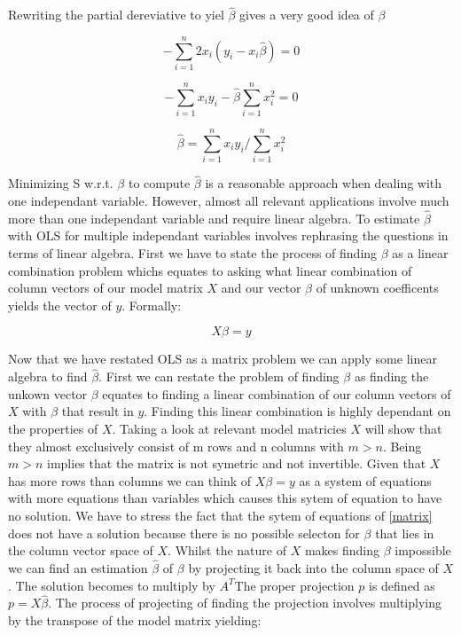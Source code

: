 \documentclass{article}
\begin{document}
    Rewriting the partial dereviative to yiel $\widehat{\beta}$ gives a very good idea of $\beta$

    \begin{equation}  - \sum_{i=1}^{n} 2x_i(y_i-x_i\widehat{\beta}) = 0  \end{equation}

    \begin{equation} - \sum_{i=1}^{n} x_iy_i-\widehat{\beta} \sum_{i=1}^{n} x_i^2 = 0  \end{equation}

    \begin{equation} \widehat{\beta} = \sum_{i=1}^{n} x_iy_i /\sum_{i=1}^{n} x_i^2 \end{equation}


    Minimizing S w.r.t. $\beta$ to compute $\widehat{\beta}$ is a reasonable approach when dealing with one independant variable. However, almost all relevant applications involve much more than one independant variable and require linear algebra. To estimate $\widehat{\beta}$ with OLS for multiple independant variables involves rephrasing the questions in terms of linear algebra. First we have to state the process of finding $\beta$ as a linear combination problem whichs equates to asking what linear combination of column vectors of our model matrix $X$ and our vector $\beta$ of unknown coefficents yields the vector of $y$. Formally:

    \begin{equation} \label{matrix} X\beta = y \end{equation}

    Now that we have restated OLS as a matrix problem we can apply some linear algebra to find $\widehat{\beta}$. First we can restate the problem of finding $\beta$ as finding the unkown vector $\beta$ equates to finding a linear combination of our column vectors of $X$ with $\beta$ that result in $y$. Finding this linear combination is highly dependant on the properties of $X$. Taking a look at relevant model matricies $X$ will show that they almost exclusively consist of m rows and n columns with $m > n$. Being $m > n$ implies that the matrix is not symetric and not invertible. Given that $X$ has more rows than columns we can think of $X\beta = y$ as a system of equations with more equations than variables which causes this sytem of equation to have no solution. We have to stress the fact that the sytem of equations of \ref{matrix} does not have a solution because there is no possible selecton for $\beta$ that lies in the column vector space of $X$. Whilst the nature of $X$ makes finding $\beta$ impossible we can find an estimation $\widehat{\beta}$ of $\beta$ by projecting it back into the column space of $X$.  The solution becomes to multiply by $A^T$The proper projection $p$ is defined as $p = X\widehat{\beta}$. The process of projecting of finding the projection involves multiplying by the transpose of the model matrix yielding:
\end{document}
